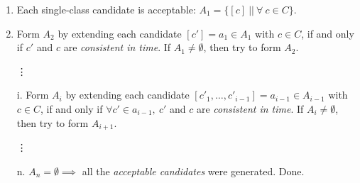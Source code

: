 \begin{enumerate}
  \item Each single-class candidate is acceptable:
    $A_1 = \lbrace [ c ] ~||~ \forall ~ c \in C \rbrace$.
  \item Form $A_2$ by extending each candidate $[c'] = a_1 \in A_1$ with $c \in C$,
    if and only if $c'$ and $c$ are \emph{consistent in time}.
    If $A_1 \not= \emptyset$, then try to form $A_2$.
  \item[\vdots]
  \item[i.] Form $A_i$ by extending each candidate $[c'_1, \dots, c'_{i-1}] = a_{i-1}
    \in A_{i-1}$ with $c \in C$, if and only if $\forall c' \in a_{i-1}, ~c'$
    and $c$ are \emph{consistent in time}.
    If $A_i \not= \emptyset$, then try to form $A_{i+1}$.
   \item[\vdots]
   \item[n.] $A_n = \emptyset \implies$ all the \emph{acceptable candidates}
     were generated. Done.
\end{enumerate}


